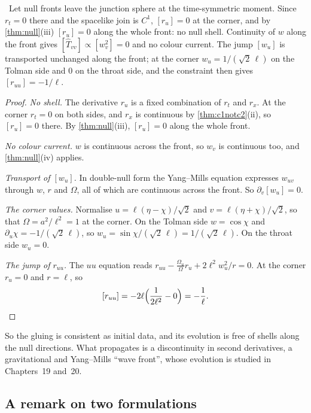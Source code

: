 \begin{theorem}\label{thm:nullfront}\ver\
Let null fronts leave the junction sphere at the time-symmetric moment. Since $r_t=0$ there and the spacelike join is $C^1$, $[r_u]=0$ at the corner, and by \cref{thm:null}(iii) $[r_u]=0$ along the whole front: no null shell. Continuity of $w$ along the front gives $[\hat T_{vv}]\propto[w_v^2]=0$ and no colour current. The jump $[w_u]$ is transported unchanged along the front; at the corner $w_u=1/(\sqrt2\,\ell)$ on the Tolman side and $0$ on the throat side, and the constraint then gives $[r_{uu}]=-1/\ell$.
\end{theorem}
\begin{proof}
\emph{No shell.} The derivative $r_u$ is a fixed combination of $r_t$ and $r_x$. At the corner $r_t=0$ on both sides, and $r_x$ is continuous by \cref{thm:c1notc2}(ii), so $[r_u]=0$ there. By \cref{thm:null}(iii), $[r_u]=0$ along the whole front.

\emph{No colour current.} $w$ is continuous across the front, so $w_v$ is continuous too, and \cref{thm:null}(iv) applies.

\emph{Transport of $[w_u]$.} In double-null form the Yang--Mills equation expresses $w_{uv}$ through $w$, $r$ and $\Omega$, all of which are continuous across the front. So $\partial_v[w_u]=0$.

\emph{The corner values.} Normalise $u=\ell(\eta-\chi)/\sqrt2$ and $v=\ell(\eta+\chi)/\sqrt2$, so that $\Omega=a^2/\ell^2=1$ at the corner. On the Tolman side $w=\cos\chi$ and $\partial_u\chi=-1/(\sqrt2\,\ell)$, so $w_u=\sin\chi/(\sqrt2\,\ell)=1/(\sqrt2\,\ell)$. On the throat side $w_u=0$.

\emph{The jump of $r_{uu}$.} The $uu$ equation reads $r_{uu}-\frac{\Omega_u}\Omega r_u+2\ell^2w_u^2/r=0$. At the corner $r_u=0$ and $r=\ell$, so
\[
[r_{uu}]=-2\ell\Bigl(\frac1{2\ell^2}-0\Bigr)=-\frac1\ell .\qedhere
\]
\end{proof}


So the gluing is consistent as initial data, and its evolution is free of shells along the null directions. What propagates is a discontinuity in second derivatives, a gravitational and Yang--Mills ``wave front'', whose evolution is studied in Chapters~19 and~20.

\subsection*{A remark on two formulations}

